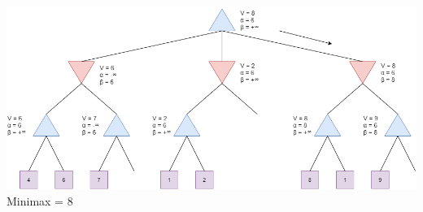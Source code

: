 \documentclass[]{scrreprt}
\begin{document}
\includegraphics[scale=0.45]{step12} \newline \newline \newline
Minimax = 8
\end{document}

